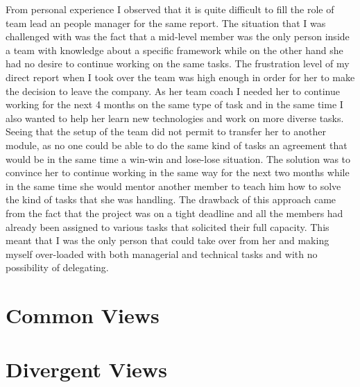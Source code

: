 From personal experience I observed that it is quite difficult to fill the role of team lead an people manager for the same report. The situation that I was challenged with was the fact that a mid-level member was the only person inside a team with knowledge about a specific framework while on the other hand she had no desire to continue working on the same tasks. The frustration level of my direct report when I took over the team was high enough in order for her to make the decision to leave the company. As her team coach I needed her to continue working for the next 4 months on the same type of task and in the same time I also wanted to help her learn new technologies and work on more diverse tasks. Seeing that the setup of the team did not permit to transfer her to another module, as no one could be able to do the same kind of tasks an agreement that would be in the same time a win-win and lose-lose situation. The solution was to convince her to continue working in the same way for the next two months while in the same time she would mentor another member to teach him how to solve the kind of tasks that she was handling. The drawback of this approach came from the fact that the project was on a tight deadline and all the members had already been assigned to various tasks that solicited their full capacity. This meant that I was the only person that could take over from her and making myself over-loaded with both managerial and technical tasks and with no possibility of delegating.

\section{Common Views}
\label{sec:common}
\section{Divergent Views}
\label{sec:divergent}


